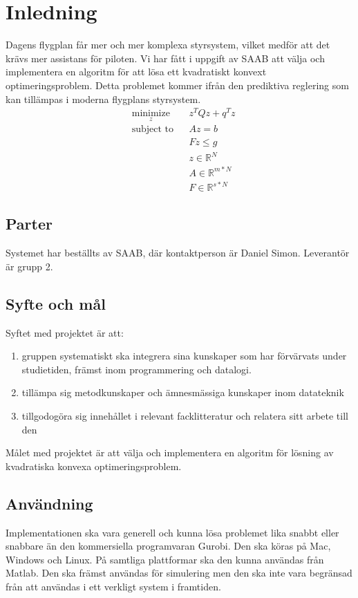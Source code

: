 \section{Inledning}
Dagens flygplan får mer och mer komplexa styrsystem, vilket medför att det krävs mer assistans för piloten. Vi har fått i uppgift av SAAB att välja och implementera en algoritm för att lösa ett kvadratiskt konvext optimeringsproblem. Detta problemet kommer ifrån den prediktiva reglering som kan tillämpas i moderna flygplans styrsystem.
\begin{equation*}
\begin{aligned}
& \underset{z}{\text{minimize}}
& & z^{T}Qz+q^{T}z \\
& \text{subject to}
& & Az=b \\
& & & Fz \leq g \\
& && z \in \mathbb{R}^N \\
& && A \in \mathbb{R}^{m*N}\\
& && F \in \mathbb{R}^{s*N}
\end{aligned}
\end{equation*}
\subsection{Parter}
Systemet har beställts av SAAB, där kontaktperson är Daniel Simon. Leverantör är grupp 2.

\subsection{Syfte och mål}
Syftet med projektet är att:
\begin{enumerate}
 \item gruppen systematiskt ska integrera sina kunskaper som har förvärvats under studietiden, främst inom programmering och datalogi. 
 \item tillämpa sig  metodkunskaper och ämnesmässiga kunskaper inom datateknik
 \item tillgodogöra sig innehållet i relevant facklitteratur och relatera sitt arbete till den
\end{enumerate}

Målet med projektet är att välja och implementera en algoritm för lösning av kvadratiska konvexa optimeringsproblem.

\subsection{Användning}
Implementationen ska vara generell och kunna lösa problemet lika snabbt eller snabbare än den kommersiella programvaran Gurobi. Den ska köras på Mac, Windows och Linux. På samtliga plattformar ska den kunna användas från Matlab. Den ska främst användas för simulering men den ska inte vara begränsad från att användas i ett verkligt system i framtiden. 

